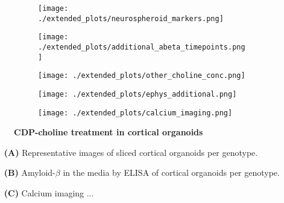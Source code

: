 \begin{figure}[H]
    \begin{subfigure}[t]{\textwidth}
        \caption{}
        \texttt{[image: ./extended\_plots/neurospheroid\_markers.png]}        
    \end{subfigure}
    \begin{subfigure}[t]{0.2\textwidth}
        \caption{}
        \texttt{[image: ./extended\_plots/additional\_abeta\_timepoints.png]}        
    \end{subfigure}
    \begin{subfigure}[t]{0.2\textwidth}
        \caption{}
        \texttt{[image: ./extended\_plots/other\_choline\_conc.png]}        
    \end{subfigure}
    \begin{subfigure}[t]{0.2\textwidth}
        \caption{}
        \texttt{[image: ./extended\_plots/ephys\_additional.png]}        
    \end{subfigure}
    \begin{subfigure}[t]{0.2\textwidth}
        \caption{}
        \texttt{[image: ./extended\_plots/calcium\_imaging.png]}        
    \end{subfigure}
    \caption{
        \textbf{CDP-choline treatment in cortical organoids}\\
    }
    \label{fig:neurospheroid_figure}
\end{figure}
\begin{itemize}
    \item[\textbf{(A)}] Representative images of sliced cortical organoids per genotype. 
    \item[\textbf{(B)}] Amyloid-$\beta$ in the media by ELISA of cortical organoids per genotype.
    \item[\textbf{(C)}] Calcium imaging ... 
\end{itemize}